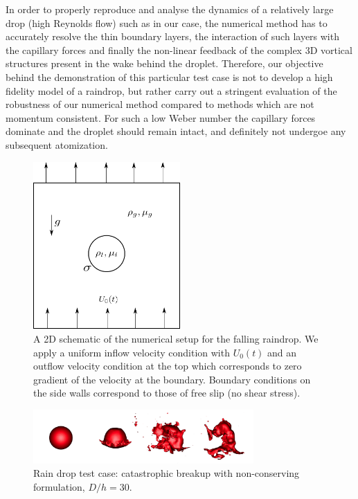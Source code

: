 In order to properly reproduce and analyse the dynamics of a relatively large drop (high Reynolds flow) such as in our case, the numerical method has to accurately resolve the thin boundary layers, the interaction of such layers with the capillary forces and finally the non-linear feedback of the complex 3D vortical structures present in the wake behind the droplet. Therefore, our objective behind the demonstration of this particular test case is not to develop a high fidelity model of a raindrop, but rather carry out a stringent evaluation of the robustness of our numerical method compared to methods which are not momentum consistent. For such a low Weber number the capillary forces dominate and the droplet should remain intact, and definitely not undergoe any subsequent atomization. 


\begin{figure}[h!]
\begin{center}
\includegraphics[width=0.5\textwidth]{Figures/Sagar/setup.png}
\end{center}
\caption{A 2D schematic of the numerical setup for the falling raindrop. We apply a uniform inflow velocity condition with $U_0(t)$ and an outflow velocity condition at the top which corresponds to zero gradient of the velocity at the boundary. Boundary conditions on the side walls correspond to those of free slip (no shear stress).}
\label{setup}
\end{figure}


\begin{figure}
\begin{center}
\includegraphics[width=0.75\textwidth]{Figures/cata.png}
\end{center}
\caption{Rain drop test case: catastrophic breakup with non-conserving 
formulation, $D/h=30$.}
\label{cata}
\end{figure}

